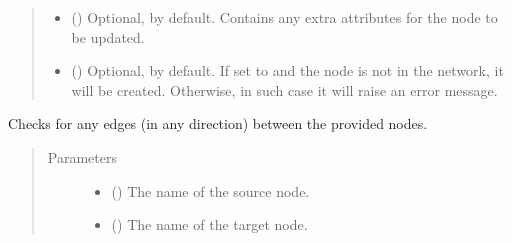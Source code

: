 \documentclass[letterpaper,10pt,english]{sphinxmanual}
\begin{document}
\begin{fulllineitems}
\begin{fulllineitems}
\begin{quote}
\begin{description}
\begin{itemize}
\item {} 
 () \textendash{} Optional, \sphinxcode{\sphinxupquote{\{\}}} by default. Contains any extra attributes
for the node to be updated.

\item {} 
 () \textendash{} Optional,  by default. If set to  and the
node is not in the network, it will be created. Otherwise,
in such case it will raise an error message.

\end{itemize}

\end{description}\end{quote}

\end{fulllineitems}


\begin{fulllineitems}
\label{\detokenize{reference:pypath.main.PyPath.affects}}
\end{fulllineitems}


\begin{fulllineitems}
\label{\detokenize{reference:pypath.main.PyPath.all_between}}
Checks for any edges (in any direction) between the provided
nodes.
\begin{quote}\begin{description}
\item[{Parameters}] \leavevmode\begin{itemize}
\item {} 
 () \textendash{} The name of the source node.

\item {} 
 () \textendash{} The name of the target node.


\end{itemize}
\end{description}
\end{quote}
\end{fulllineitems}
\end{fulllineitems}
\end{document}
